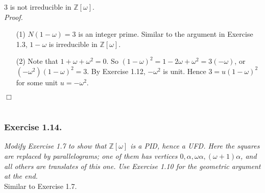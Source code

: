 \documentclass{article}
\begin{document}
$3$ is not irreducible in $\mathbb{Z}[\omega]$. \\

\emph{Proof.}
\begin{enumerate}
\item[(1)]
$N(1-\omega) = 3$ is an integer prime.
Similar to the argument in Exercise 1.3,
$1-\omega$ is irreducible in $\mathbb{Z}[\omega]$.
\item[(2)]
Note that $1+\omega+\omega^2=0$.
So
$(1-\omega)^2 = 1-2\omega+\omega^2 = 3(-\omega)$, or
$(-\omega^2)(1-\omega)^2 = 3$.
By Exercise 1.12, $-\omega^2$ is unit.
Hence $3 = u(1-\omega)^2$ for some unit $u = -\omega^2$.
\end{enumerate}
$\Box$ \\\\






\subsubsection*{Exercise 1.14.}
\emph{Modify Exercise 1.7 to show that $\mathbb{Z}[\omega]$ is a PID, hence a UFD.
Here the squares are replaced by parallelograms;
one of them has vertices $0, \alpha, \omega\alpha, (\omega+1)\alpha$,
and all others are translates of this one.
Use Exercise 1.10 for the geometric argument at the end. } \\

Similar to Exercise 1.7. \\
\end{document}
